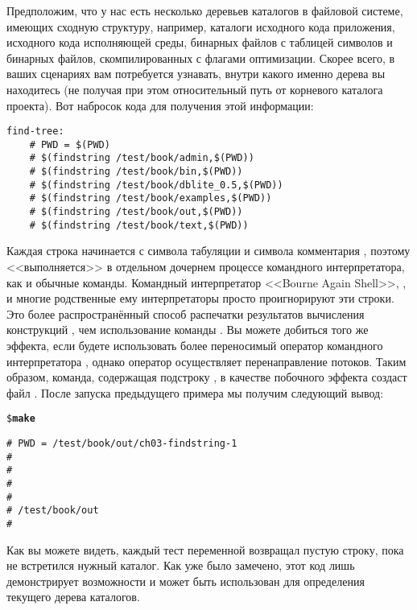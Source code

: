 \begin{description}
Предположим, что у нас есть несколько деревьев каталогов в файловой
системе, имеющих сходную структуру, например, каталоги исходного кода
приложения, исходного кода исполняющей среды, бинарных файлов с
таблицей символов и бинарных файлов, скомпилированных с флагами
оптимизации.  Скорее всего, в ваших сценариях вам потребуется
узнавать, внутри какого именно дерева вы находитесь (не получая при
этом относительный путь от корневого каталога проекта).  Вот набросок
кода для получения этой информации:

{\footnotesize
\begin{verbatim}
find-tree:
    # PWD = $(PWD)
    # $(findstring /test/book/admin,$(PWD))
    # $(findstring /test/book/bin,$(PWD))
    # $(findstring /test/book/dblite_0.5,$(PWD))
    # $(findstring /test/book/examples,$(PWD))
    # $(findstring /test/book/out,$(PWD))
    # $(findstring /test/book/text,$(PWD))
\end{verbatim}
}

Каждая строка начинается с символа табуляции и символа комментария
, поэтому <<выполняется>> в отдельном дочернем процессе
командного интерпретатора, как и обычные команды. Командный
интерпретатор <<Bourne Again Shell>>, , и многие
родственные ему интерпретаторы просто проигнорируют эти строки. Это
более распространённый способ распечатки результатов вычисления
конструкций \GNUmake{}, чем использование команды . Вы
можете добиться того же эффекта, если будете использовать более
переносимый оператор командного интерпретатора \command{:}, однако
оператор \command{:} осуществляет перенаправление потоков. Таким
образом, команда, содержащая подстроку , в качестве
побочного эффекта создаст файл . После запуска
предыдущего примера мы получим следующий вывод:

{\footnotesize
\begin{alltt}
\${} \textbf{make}
\begin{verbatim}
# PWD = /test/book/out/ch03-findstring-1
# 
# 
# 
# 
# /test/book/out
#
\end{verbatim}
\end{alltt}
}

Как вы можете видеть, каждый тест переменной 
возвращал пустую строку, пока не встретился нужный каталог. Как уже
было замечено, этот код лишь демонстрирует возможности
 и может быть использован для определения
текущего дерева каталогов.
\end{description}

